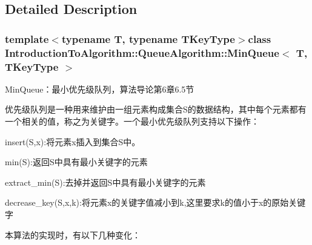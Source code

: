 \subsection{Detailed Description}
\subsubsection*{template$<$typename T, typename T\+Key\+Type$>$class Introduction\+To\+Algorithm\+::\+Queue\+Algorithm\+::\+Min\+Queue$<$ T, T\+Key\+Type $>$}

Min\+Queue：最小优先级队列，算法导论第6章6.5节 

优先级队列是一种用来维护由一组元素构成集合\+S的数据结构，其中每个元素都有一个相关的值，称之为关键字。一个最小优先级队列支持以下操作：


\begin{DoxyItemize}
\item insert(\+S,x)\+:将元素x插入到集合\+S中。
\item min(\+S)\+:返回\+S中具有最小关键字的元素
\item extract\+\_\+min(\+S)\+:去掉并返回\+S中具有最小关键字的元素
\item decrease\+\_\+key(\+S,x,k)\+:将元素x的关键字值减小到k,这里要求k的值小于x的原始关键字
\end{DoxyItemize}

本算法的实现时，有以下几种变化：


